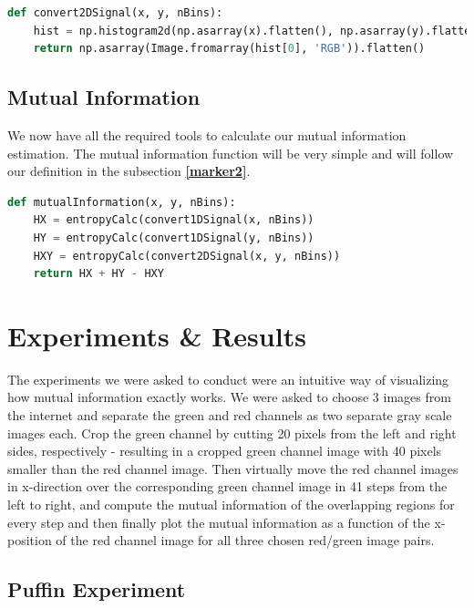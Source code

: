 \documentclass{article}
\begin{document}
\begin{lstlisting}[language=Python, caption=2D Signal (Joint Histogram)]
def convert2DSignal(x, y, nBins):
    hist = np.histogram2d(np.asarray(x).flatten(), np.asarray(y).flatten(), bins=nBins)
    return np.asarray(Image.fromarray(hist[0], 'RGB')).flatten()
\end{lstlisting}

\subsection{Mutual Information}
\begin{flushleft}
We now have all the required tools to calculate our mutual information estimation. The mutual information function will be very simple and will follow our definition in the subsection \textbf{\ref{marker2}}.
\end{flushleft}

\begin{lstlisting}[language=Python, caption=Mutual Information]
def mutualInformation(x, y, nBins):
    HX = entropyCalc(convert1DSignal(x, nBins))
    HY = entropyCalc(convert1DSignal(y, nBins))
    HXY = entropyCalc(convert2DSignal(x, y, nBins))
    return HX + HY - HXY
\end{lstlisting}

\section{Experiments \& Results}

\begin{flushleft}
The experiments we were asked to conduct were an intuitive way of visualizing how mutual information exactly works. We were asked to choose 3 images from the internet and separate the green and red channels as two separate gray scale images each. Crop the green channel by cutting 20 pixels from the left and right sides, respectively - resulting in a cropped green channel image with 40 pixels smaller than the red channel image. Then virtually move the red channel images in x-direction over the corresponding green channel image in 41 steps from the left to right, and compute the mutual information of the overlapping regions for every step and then finally plot the mutual information as a function of the x-position of the red channel image for all three chosen red/green image pairs.
\end{flushleft}

\subsection{Puffin Experiment}
\newpage
\end{document}

